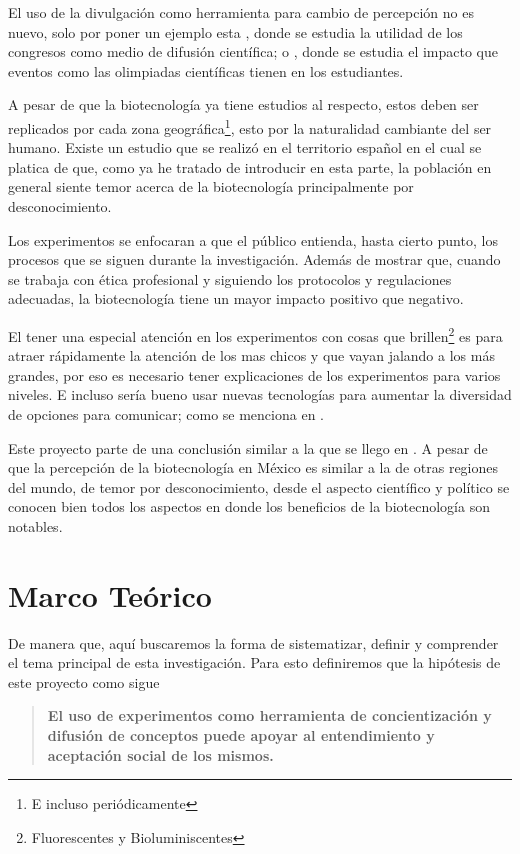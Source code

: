 \documentclass[12pt]{article}
\begin{document}
	\par El uso de la divulgación como herramienta para cambio de percepción no es nuevo, solo por poner un ejemplo esta \cite{utilidad congresos}, donde se estudia la utilidad de los congresos como medio de difusión científica; o \cite{olimpiadas}, donde se estudia el impacto que eventos como las olimpiadas científicas tienen en los estudiantes.
	\par A pesar de que la biotecnología ya tiene estudios al respecto, estos deben ser replicados por cada zona geográfica\footnote{E incluso periódicamente}, esto por la naturalidad cambiante del ser humano. Existe un estudio que se realizó en el territorio español \cite{bio en espania} en el cual se platica de que, como ya he tratado de introducir en esta parte, la población en general siente temor acerca de la biotecnología principalmente por desconocimiento.
	\par Los experimentos se enfocaran a que el público entienda, hasta cierto punto, los procesos que se siguen durante la investigación. Además de mostrar que, cuando se trabaja con ética profesional y siguiendo los protocolos y regulaciones adecuadas, la biotecnología tiene un mayor impacto positivo que negativo. 
	\par El tener una especial atención en los experimentos con cosas que brillen\footnote{Fluorescentes y Bioluminiscentes} es para atraer rápidamente la atención de los mas chicos y que vayan jalando a los más grandes, por eso es necesario tener explicaciones de los experimentos para varios niveles. E incluso sería bueno usar nuevas tecnologías para aumentar la diversidad de opciones para comunicar; como se menciona en \cite{vr}.
	\par Este proyecto parte de una conclusión similar a la que se llego en \cite{biot mexico}. A pesar de que la percepción de la biotecnología en México es similar a la de otras regiones del mundo, de temor por desconocimiento, desde el aspecto científico y político se conocen bien todos los aspectos en donde los beneficios de la biotecnología son notables.







\newpage
\section{Marco Teórico}

	\par De manera que, aquí buscaremos la forma de sistematizar, definir y comprender el tema principal de esta investigación. Para esto definiremos que la hipótesis de este proyecto como sigue
	\begin{quote}\bf
		El uso de experimentos como herramienta de concientización y difusión de conceptos puede apoyar al entendimiento y aceptación social de los mismos.
	\end{quote}
	
\end{document}
